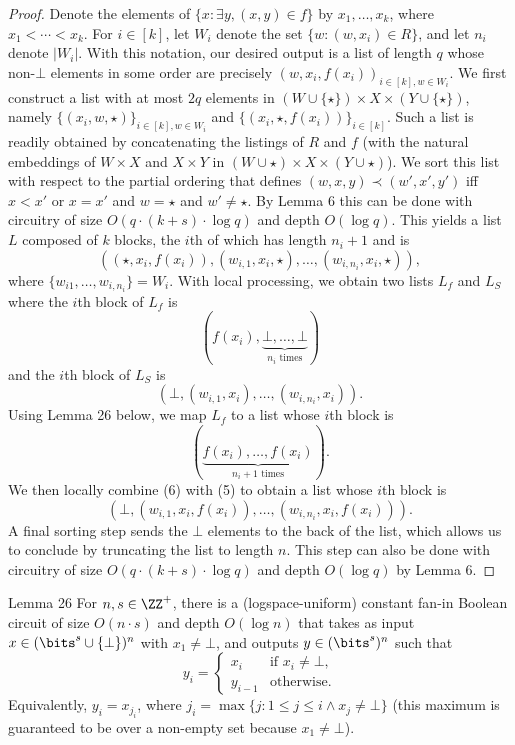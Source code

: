 \begin{proof}
Denote the elements of $\{x:\exists y,(x,y)\in f\}$ by $x_1,\ldots,x_k$, where $x_1<\cdots<x_k$. For $i\in[k]$, let $W_i$ denote the set $\{w:(w,x_i)\in R\}$, and let $n_i$ denote $|W_i|$. With this notation, our desired output is a list of length $q$ whose non-$\bot$ elements in some order are precisely $(w,x_i,f(x_i))_{i\in[k],w\in W_i}$.
We first construct a list with at most $2q$ elements in $(W\cup\{\star\})\times X\times(Y\cup\{\star\})$, namely $\{(x_i,w,\star)\}_{i\in[k],w\in W_i}$ and $\{(x_i,\star,f(x_i))\}_{i\in[k]}$. Such a list is readily obtained by concatenating the listings of $R$ and $f$ (with the natural embeddings of $W\times X$ and $X\times Y$ in $(W\cup\star)\times X\times(Y\cup\star)$).
We sort this list with respect to the partial ordering that defines $(w,x,y)\prec(w',x',y')$ iff $x<x'$ or $x=x'$ and $w=\star$ and $w'\ne\star$. By Lemma 6 this can be done with circuitry of size $O(q\cdot(k+s)\cdot\log q)$ and depth $O(\log q)$. This yields a list $L$ composed of $k$ blocks, the $i$th of which has length $n_i+1$ and is
\[((\star,x_i,f(x_i)),(w_{i,1},x_i,\star),\ldots,(w_{i,n_i},x_i,\star)),\]
where $\{w_{i1},\ldots,w_{i,n_i}\}=W_i$.
With local processing, we obtain two lists $L_f$ and $L_S$ where the $i$th block of $L_f$ is
\[(f(x_i),\underbrace{\bot,\ldots,\bot}_{n_i\text{ times}})\tag{4}\]
and the $i$th block of $L_S$ is
\[(\bot,(w_{i,1},x_i),\ldots,(w_{i,n_i},x_i)).\tag{5}\]
Using Lemma 26 below, we map $L_f$ to a list whose $i$th block is
\[(\underbrace{f(x_i),\ldots,f(x_i)}_{n_i+1\text{ times}}).\tag{6}\]
We then locally combine (6) with (5) to obtain a list whose $i$th block is
\[(\bot,(w_{i,1},x_i,f(x_i)),\ldots,(w_{i,n_i},x_i,f(x_i))).\tag{7}\]
A final sorting step sends the $\bot$ elements to the back of the list, which allows us to conclude by truncating the list to length $n$. This step can also be done with circuitry of size $O(q\cdot(k+s)\cdot\log q)$ and depth $O(\log q)$ by Lemma 6.
\end{proof}
\begin{originalresult}{Lemma 26}
For $n,s\in\ZZ^+$, there is a (logspace-uniform) constant fan-in Boolean circuit of size $O(n\cdot s)$ and depth $O(\log n)$ that takes as input $x\in(\bits^s\cup\{\bot\})^n$ with $x_1\ne\bot$, and outputs $y\in(\bits^s)^n$ such that
\[y_i=\begin{cases}x_i&\text{if }x_i\ne\bot,\\y_{i-1}&\text{otherwise}.\end{cases}\]
Equivalently, $y_i=x_{j_i}$, where $j_i=\max\{j:1\le j\le i\land x_j\ne\bot\}$ (this maximum is guaranteed to be over a non-empty set because $x_1\ne\bot$).
\end{originalresult}
